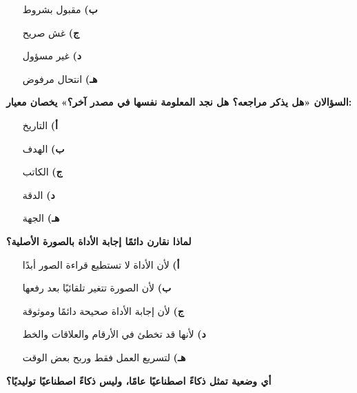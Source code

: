 \documentclass[11pt,a4paper]{article}
\begin{document}
\begin{multicols}{2}
\begin{minipage}{\linewidth}
\begin{itemize}[leftmargin=0.95cm, labelsep=4pt, itemsep=0pt, topsep=2pt, parsep=0pt]
  \item[\textbf{ب)}] مقبول بشروط
  \item[\textbf{ج)}] غش صريح
  \item[\textbf{د)}] غير مسؤول
  \item[\textbf{هـ)}] انتحال مرفوض
\end{itemize}
\end{minipage}\par\vspace{7pt plus 4pt}
\noindent\begin{minipage}{\linewidth}
\hangindent=0.7cm\textbf{السؤالان «هل يذكر مراجعه؟ هل نجد المعلومة نفسها في مصدر آخر؟» يخصان معيار:}
\begin{itemize}[leftmargin=0.95cm, labelsep=4pt, itemsep=0pt, topsep=2pt, parsep=0pt]
  \item[\textbf{أ)}] التاريخ
  \item[\textbf{ب)}] الهدف
  \item[\textbf{ج)}] الكاتب
  \item[\textbf{د)}] الدقة
  \item[\textbf{هـ)}] الجهة
\end{itemize}
\end{minipage}\par\vspace{7pt plus 4pt}
\noindent\begin{minipage}{\linewidth}
\hangindent=0.7cm\textbf{لماذا نقارن دائمًا إجابة الأداة بالصورة الأصلية؟}
\begin{itemize}[leftmargin=0.95cm, labelsep=4pt, itemsep=0pt, topsep=2pt, parsep=0pt]
  \item[\textbf{أ)}] لأن الأداة لا تستطيع قراءة الصور أبدًا
  \item[\textbf{ب)}] لأن الصورة تتغير تلقائيًا بعد رفعها
  \item[\textbf{ج)}] لأن إجابة الأداة صحيحة دائمًا وموثوقة
  \item[\textbf{د)}] لأنها قد تخطئ في الأرقام والعلاقات والخط
  \item[\textbf{هـ)}] لتسريع العمل فقط وربح بعض الوقت
\end{itemize}
\end{minipage}\par\vspace{7pt plus 4pt}
\noindent\begin{minipage}{\linewidth}
\hangindent=0.7cm\textbf{أي وضعية تمثل ذكاءً اصطناعيًا عامًا، وليس ذكاءً اصطناعيًا توليديًا؟}

\end{minipage}
\end{multicols}
\end{document}
